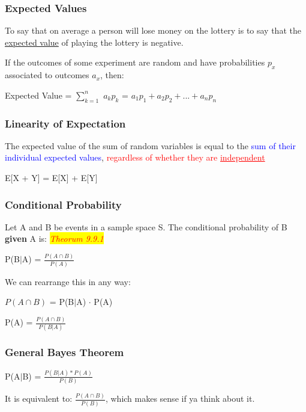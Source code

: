 \documentclass{article}
\newcommand{\theorum}[1]{\quad \quad \colorbox{yellow}{\textit{\textcolor{red}{Theorum #1}}}}
\newcommand{\sbreak}{\vspace{10pt}}
\begin{document}
\subsubsection{Expected Values}
To say that on average a person will lose money on the lottery is to say that the \underline{expected value} of playing the lottery is negative.

If the outcomes of some experiment are random and have probabilities $p_x$ associated to outcomes $a_x$, then:
\begin{center}
    Expected Value = $\sum_{k=1}^{n}$ $a_kp_k$ = $a_1p_1 + a_2p_2 + ... + a_np_n$
\end{center}

\subsubsection{Linearity of Expectation}
The expected value of the sum of random variables is equal to the \textcolor{blue}{sum of their individual expected values}, \textcolor{red}{regardless of whether they are \underline{independent}}

\begin{center}
    E[X + Y] = E[X] + E[Y]
\end{center}

\subsubsection{Conditional Probability}
Let A and B be events in a sample space S. The conditional probability of B \textbf{given} A is: \theorum{9.9.1}
\begin{center}
    P(B$|$A) = $\frac{P(A\cap B)}{P(A)}$
\end{center}

\sbreak

We can rearrange this in any way:

\sbreak

$P(A\cap B)$ = P(B$|$A) $\cdot$ P(A)

\sbreak

P(A) = $\frac{P(A\cap B)}{P(B|A)}$

\subsubsection{General Bayes Theorem}
P(A$|$B) = $\frac{P(B|A) * P(A)}{P(B)}$

It is equivalent to: $\frac{P(A \cap B)}{P(B)}$, which makes sense if ya think about it.
\end{document}
